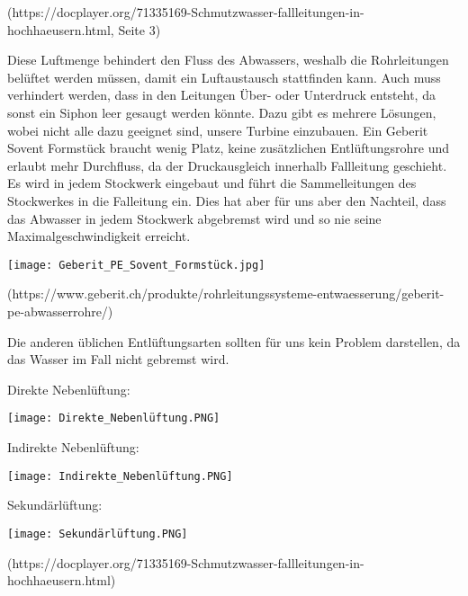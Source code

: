 (https://docplayer.org/71335169-Schmutzwasser-fallleitungen-in-hochhaeusern.html, Seite 3)

Diese Luftmenge behindert den Fluss des Abwassers, weshalb die Rohrleitungen belüftet werden müssen, damit ein Luftaustausch stattfinden kann. Auch muss verhindert werden, dass in den Leitungen Über- oder Unterdruck entsteht, da sonst ein Siphon leer gesaugt werden könnte. Dazu gibt es mehrere Lösungen, wobei nicht alle dazu geeignet sind, unsere Turbine einzubauen. Ein Geberit Sovent Formstück braucht wenig Platz, keine zusätzlichen Entlüftungsrohre und erlaubt mehr Durchfluss, da der Druckausgleich innerhalb Fallleitung geschieht. Es wird in jedem Stockwerk eingebaut und führt die Sammelleitungen des Stockwerkes in die Falleitung ein. Dies hat aber für uns aber den Nachteil, dass das Abwasser in jedem Stockwerk abgebremst wird und so nie seine Maximalgeschwindigkeit erreicht.

\begin{center}

\texttt{[image: Geberit\_PE\_Sovent\_Formstück.jpg]}

\end{center}

(https://www.geberit.ch/produkte/rohrleitungssysteme-entwaesserung/geberit-pe-abwasserrohre/)

Die anderen üblichen Entlüftungsarten sollten für uns kein Problem darstellen, da das Wasser im Fall nicht gebremst wird.


Direkte Nebenlüftung:

\begin{center}

\texttt{[image: Direkte\_Nebenlüftung.PNG]}

\end{center}

Indirekte Nebenlüftung:

\begin{center}

\texttt{[image: Indirekte\_Nebenlüftung.PNG]}

\end{center}

Sekundärlüftung:

\begin{center}

\texttt{[image: Sekundärlüftung.PNG]}

\end{center}

(https://docplayer.org/71335169-Schmutzwasser-fallleitungen-in-hochhaeusern.html)

